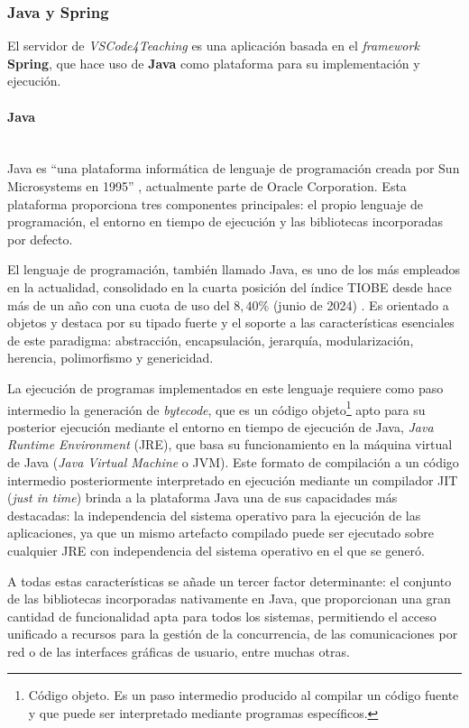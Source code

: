 \subsubsection{Java y Spring}
\label{subsec:tecSpring}
El servidor de \textit{VSCode4Teaching} es una aplicación basada en el \textit{framework} \textbf{Spring}, que hace uso de \textbf{Java} como plataforma para su implementación y ejecución.

\paragraph{Java}\mbox{} \\
Java es ``una plataforma informática de lenguaje de programación creada por Sun Microsystems en 1995'' \cite{Java}, actualmente parte de Oracle Corporation. Esta plataforma proporciona tres componentes principales: el propio lenguaje de programación, el entorno en tiempo de ejecución y las bibliotecas incorporadas por defecto.

El lenguaje de programación, también llamado Java, es uno de los más empleados en la actualidad, consolidado en la cuarta posición del índice TIOBE desde hace más de un año con una cuota de uso del $8,40\%$ (junio de 2024) \cite{TIOBE}. Es orientado a objetos y destaca por su tipado fuerte y el soporte a las características esenciales de este paradigma: abstracción, encapsulación, jerarquía, modularización, herencia, polimorfismo y genericidad.

La ejecución de programas implementados en este lenguaje requiere como paso intermedio la generación de \textit{bytecode}, que es un código objeto\footnote{Código objeto. Es un paso intermedio producido al compilar un código fuente y que puede ser interpretado mediante programas específicos.} apto para su posterior ejecución mediante el entorno en tiempo de ejecución de Java, \textit{Java Runtime Environment} (JRE), que basa su funcionamiento en la máquina virtual de Java (\textit{Java Virtual Machine} o JVM). Este formato de compilación a un código intermedio posteriormente interpretado en ejecución mediante un compilador JIT (\textit{just in time}) brinda a la plataforma Java una de sus capacidades más destacadas: la independencia del sistema operativo para la ejecución de las aplicaciones, ya que un mismo artefacto compilado puede ser ejecutado sobre cualquier JRE con independencia del sistema operativo en el que se generó.

A todas estas características se añade un tercer factor determinante: el conjunto de las bibliotecas incorporadas nativamente en Java, que proporcionan una gran cantidad de funcionalidad apta para todos los sistemas, permitiendo el acceso unificado a recursos para la gestión de la concurrencia, de las comunicaciones por red o de las interfaces gráficas de usuario, entre muchas otras.

